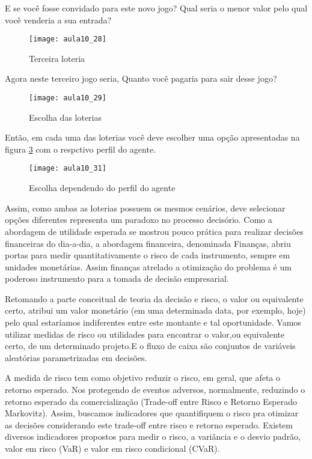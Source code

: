 E se você fosse convidado para este novo jogo? Qual seria o menor valor pelo qual você venderia a sua entrada?

\begin{figure}[H]
\begin{centering}
\texttt{[image: aula10\_28]}\protect\caption{\label{fig:aula10_28} Terceira loteria}
\end{centering}
\end{figure}

Agora neste terceiro jogo seria, Quanto você pagaria para sair desse jogo?

\begin{figure}[H]
\begin{centering}
\texttt{[image: aula10\_29]}\protect\caption{\label{fig:aula10_29} Escolha das loterias}
\end{centering}
\end{figure}


Então, em cada uma das loterias você deve escolher uma opção apresentadas na figura \ref{fig:aula10_31} com o respctivo perfil do agente.

\begin{figure}[H]
\begin{centering}
\texttt{[image: aula10\_31]}\protect\caption{\label{fig:aula10_31} Escolha dependendo do perfil do agente}
\end{centering}
\end{figure}

Assim, como ambas as loterias possuem os mesmos cenários, deve selecionar opções diferentes representa um paradoxo no processo decisório.
 Como a abordagem de utilidade esperada se mostrou pouco prática para realizar decisões financeiras do dia-a-dia, a abordagem financeira, denominada Finanças, abriu portas para medir quantitativamente o risco de cada instrumento, sempre em unidades
monetárias. Assim finanças atrelado a otimização do problema é um poderoso instrumento para a tomada de decisão empresarial.
 
 Retomando a parte conceitual de teoria da decisão e risco, o valor ou equivalente certo, atribui um valor monetário (em uma determinada data, por exemplo, hoje) pelo qual estaríamos indiferentes entre este montante e tal oportunidade. Vamos utilizar medidas de risco ou utilidades para encontrar o valor,ou equivalente certo, de um determinado projeto.E o fluxo de caixa são conjuntos de variáveis aleatórias parametrizadas em decisões.

 A medida de risco tem como objetivo reduzir o risco, em geral, que afeta o retorno esperado. Nos protegendo de eventos adversos, normalmente, reduzindo o retorno esperado da comercialização (Trade-off entre Risco e Retorno Esperado \textendash{}Markovitz). Assim, buscamos indicadores que quantifiquem o risco pra otimizar
as decisões considerando este trade-off entre risco e retorno esperado. Existem diversos indicadores propostos para medir o risco, a variância e o desvio padrão, valor em risco (VaR) e valor em risco condicional (CVaR).
